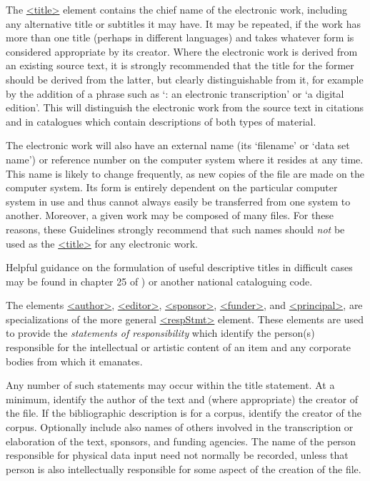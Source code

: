 \par
The \hyperref[TEI.title]{<title>} element contains the chief name of the electronic work, including any alternative title or subtitles it may have. It may be repeated, if the work has more than one title (perhaps in different languages) and takes whatever form is considered appropriate by its creator. Where the electronic work is derived from an existing source text, it is strongly recommended that the title for the former should be derived from the latter, but clearly distinguishable from it, for example by the addition of a phrase such as ‘: an electronic transcription’ or ‘a digital edition’.  This will distinguish the electronic work from the source text in citations and in catalogues which contain descriptions of both types of material.\par
The electronic work will also have an external name (its ‘filename’ or ‘data set name’) or reference number on the computer system where it resides at any time. This name is likely to change frequently, as new copies of the file are made on the computer system. Its form is entirely dependent on the particular computer system in use and thus cannot always easily be transferred from one system to another. Moreover, a given work may be composed of many files. For these reasons, these Guidelines strongly recommend that such names should \textit{not} be used as the \hyperref[TEI.title]{<title>} for any electronic work.\par
Helpful guidance on the formulation of useful descriptive titles in difficult cases may be found in chapter 25 of \cite{HD-BIBL-1}) or another national cataloguing code.\par
The elements \hyperref[TEI.author]{<author>}, \hyperref[TEI.editor]{<editor>}, \hyperref[TEI.sponsor]{<sponsor>}, \hyperref[TEI.funder]{<funder>}, and \hyperref[TEI.principal]{<principal>}, are specializations of the more general \hyperref[TEI.respStmt]{<respStmt>} element. These elements are used to provide the \textit{statements of responsibility} which identify the person(s) responsible for the intellectual or artistic content of an item and any corporate bodies from which it emanates.\par
Any number of such statements may occur within the title statement. At a minimum, identify the author of the text and (where appropriate) the creator of the file. If the bibliographic description is for a corpus, identify the creator of the corpus.  Optionally include also names of others involved in the transcription or elaboration of the text, sponsors, and funding agencies. The name of the person responsible for physical data input need not normally be recorded, unless that person is also intellectually responsible for some aspect of the creation of the file.\par
